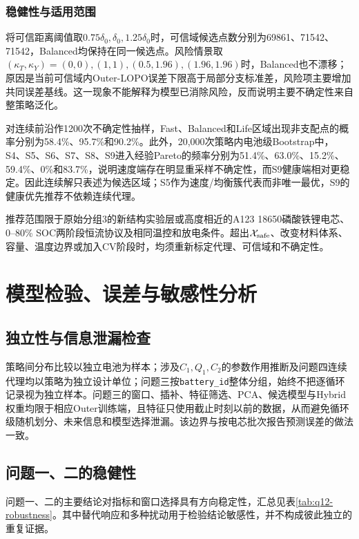 \documentclass[withoutpreface]{cumcmthesis}
\begin{document}
\subsubsection{稳健性与适用范围}
将可信距离阈值取$0.75\delta_0,\delta_0,1.25\delta_0$时，可信域候选点数分别为69861、71542、71542，Balanced均保持在同一候选点。风险情景取$(\kappa_T,\kappa_Y)=(0,0),(1,1),(0.5,1.96),(1.96,1.96)$时，Balanced也不漂移；原因是当前可信域内Outer-LOPO误差下限高于局部分支标准差，风险项主要增加共同误差基线。这一现象不能解释为模型已消除风险，反而说明主要不确定性来自整策略泛化。

对连续前沿作1200次不确定性抽样，Fast、Balanced和Life区域出现非支配点的概率分别为58.4\%、95.7\%和90.2\%。此外，20,000次策略内电池级Bootstrap中，S4、S5、S6、S7、S8、S9进入经验Pareto的频率分别为51.4\%、63.0\%、15.2\%、59.4\%、0\%和83.7\%，说明速度端存在明显重采样不确定性，而S9健康端相对更稳定。因此连续解只表述为候选区域；S5作为速度/均衡簇代表而非唯一最优，S9的健康优先推荐不依赖连续代理。

推荐范围限于原始分组3的新结构实验层或高度相近的A123 18650磷酸铁锂电芯、0--80\% SOC两阶段恒流协议及相同温控和放电条件。超出$\mathcal X_{\rm safe}$、改变材料体系、容量、温度边界或加入CV阶段时，均须重新标定代理、可信域和不确定性。
\FloatBarrier


\section{模型检验、误差与敏感性分析}
\subsection{独立性与信息泄漏检查}
策略间分布比较以独立电池为样本；涉及$C_1,Q_1,C_2$的参数作用推断及问题四连续代理均以策略为独立设计单位；问题三按\texttt{battery\_id}整体分组，始终不把逐循环记录视为独立样本。问题三的窗口、插补、特征筛选、PCA、候选模型与Hybrid权重均限于相应Outer训练端，且特征只使用截止时刻以前的数据，从而避免循环级随机划分、未来信息和模型选择泄漏。该边界与按电芯批次报告预测误差的做法一致\cite{wang2021}。

\subsection{问题一、二的稳健性}
问题一、二的主要结论对指标和窗口选择具有方向稳定性，汇总见表\ref{tab:q12-robustness}。其中替代响应和多种扰动用于检验结论敏感性，并不构成彼此独立的重复证据。
\end{document}
